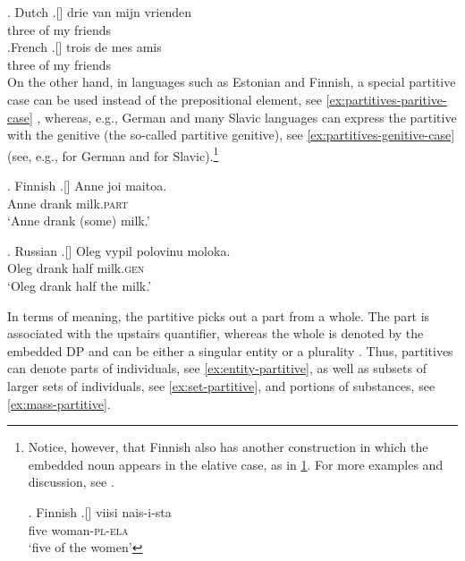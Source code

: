 \ex. Dutch
\bg.[] drie van mijn vrienden\label{ex:partitives-germanic}\\
three of my friends\\

\ex.French
\bg.[] trois de mes amis\label{ex:partitives-romance}\\
three of my friends\\

On the other hand, in languages such as Estonian and Finnish, a special partitive case can be used instead of the prepositional element, see \ref{ex:partitives-paritive-case} \citep{de_hoop2003partitivity}, whereas, e.g., German and many Slavic languages can express the partitive with the genitive (the so-called partitive genitive), see \ref{ex:partitives-genitive-case} (see, e.g., \citealt{hoeing1997phrase} for German and \citealt{valkova1999semantics,rutkowski2007syntactic} for Slavic).\footnote{Notice, however, that Finnish also has another construction in which the embedded noun appears in the elative case, as in \ref{ex:partitives-elative}. For more examples and discussion, see \citet{anttila_fong2000partitive}.

\ex. Finnish \citep[p. 111]{karlsson1999finnish}
\bg.[] viisi nais-i-sta\\
five woman-\textsc{pl}-\textsc{ela}\\
`five of the women'\label{ex:partitives-elative}

}

\ex. Finnish \citep{de_hoop2003partitivity}
\bg.[] Anne joi maitoa.\label{ex:partitives-paritive-case}\\
Anne drank milk\textsc{.part}\\
`Anne drank (some) milk.'

\ex. Russian
\bg.[] Oleg vypil polovinu moloka.\label{ex:partitives-genitive-case}\\
Oleg drank half milk\textsc{.gen}\\
`Oleg drank half the milk.'

In terms of meaning, the partitive picks out a part from a whole. The part is associated with the upstairs quantifier, whereas the whole is denoted by the embedded DP and can be either a singular entity or a plurality \citep[e.g.,][]{jackendoff1977x-bar,selkirk1977some,ladusaw1982semantic}. Thus, partitives can denote parts of individuals, see \ref{ex:entity-partitive}, as well as subsets of larger sets of individuals, see \ref{ex:set-partitive}, and portions of substances, see \ref{ex:mass-partitive}.\largerpage

